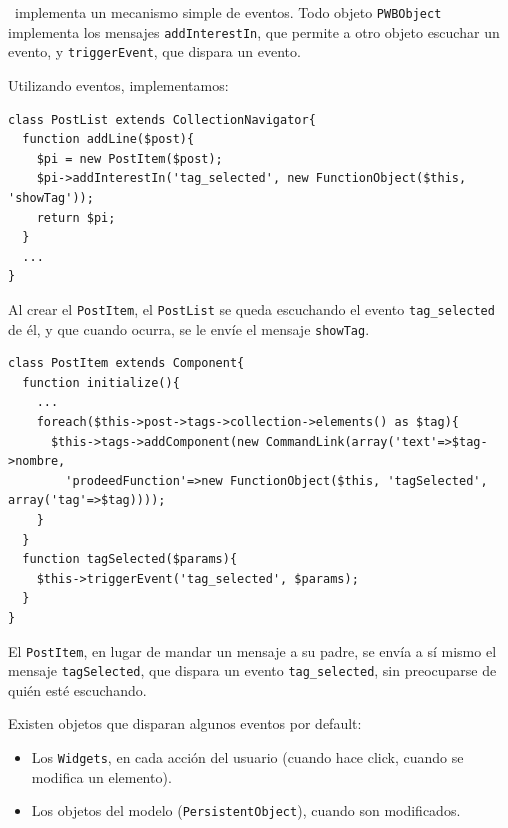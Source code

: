 \PWB\ implementa un mecanismo simple de eventos. Todo objeto \verb"PWBObject" implementa los mensajes \verb"addInterestIn", que permite a otro objeto escuchar un evento, y \verb"triggerEvent", que dispara un evento.

Utilizando eventos, implementamos:

\begin{verbatim}
class PostList extends CollectionNavigator{
  function addLine($post){
    $pi = new PostItem($post);
    $pi->addInterestIn('tag_selected', new FunctionObject($this, 'showTag'));
    return $pi;
  }
  ...
}
\end{verbatim}

Al crear el \verb'PostItem', el \verb'PostList' se queda escuchando el evento \verb'tag_selected' de él, y que cuando ocurra, se le envíe el mensaje \verb'showTag'.

\begin{verbatim}
class PostItem extends Component{
  function initialize(){
    ...
    foreach($this->post->tags->collection->elements() as $tag){
      $this->tags->addComponent(new CommandLink(array('text'=>$tag->nombre,
        'prodeedFunction'=>new FunctionObject($this, 'tagSelected', array('tag'=>$tag))));
    }
  }
  function tagSelected($params){
    $this->triggerEvent('tag_selected', $params);
  }
}

\end{verbatim}

El \verb'PostItem', en lugar de mandar un mensaje a su padre, se envía a sí mismo el mensaje \verb'tagSelected', que dispara un evento \verb'tag_selected', sin preocuparse de quién esté escuchando.

Existen objetos que disparan algunos eventos por default:
\begin{itemize}
\item Los \verb"Widgets", en cada acción del usuario (cuando hace click, cuando se modifica un elemento).
\item Los objetos del modelo (\verb"PersistentObject"), cuando son modificados.
\end{itemize}


